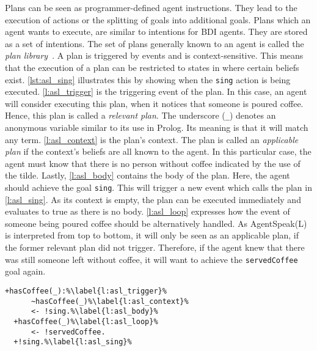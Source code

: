 Plans can be seen as programmer-defined agent instructions.
They lead to the execution of actions or the splitting of goals into additional goals.
Plans which an agent wants to execute, are similar to intentions for BDI agents.
They are stored as a set of intentions.
The set of plans generally known to an agent is called the \emph{plan library}~\cite{bordini_jason_2005}.
A plan is triggered by events and is context-sensitive.
This means that the execution of a plan can be restricted to states in where certain beliefs exist.
\autoref{lst:asl_sing} illustrates this by showing when the \texttt{sing} action is being executed.
\autoref{l:asl_trigger} is the triggering event of the plan.
In this case, an agent will consider executing this plan, when it notices that someone is poured coffee.
Hence, this plan is called a \emph{relevant plan}.
The underscore (\texttt{\_}) denotes an anonymous variable similar to its use in Prolog.
Its meaning is that it will match any term.
\autoref{l:asl_context} is the plan's context.
The plan is called an \emph{applicable plan} if the context's beliefs are all known to the agent.
In this particular case, the agent must know that there is no person without coffee indicated by the use of the tilde.
Lastly, \autoref{l:asl_body} contains the body of the plan.
Here, the agent should achieve the goal \texttt{sing}.
This will trigger a new event which calls the plan in \autoref{l:asl_sing}.
As its context is empty, the plan can be executed immediately and evaluates to true as there is no body.
\autoref{l:asl_loop} expresses how the event of someone being poured coffee should be alternatively handled.
As AgentSpeak(L) is interpreted from top to bottom, it will only be seen as an applicable plan, if the former relevant plan did not trigger.
Therefore, if the agent knew that there was still someone left without coffee, it will want to achieve the \texttt{servedCoffee} goal again.
\begin{lstlisting}[firstnumber=4, caption={Events for handling someone being poured a coffee as well as the \texttt{sing} plan.}, label=lst:asl_sing]
  +hasCoffee(_):%\label{l:asl_trigger}%
      ~hasCoffee(_)%\label{l:asl_context}%
      <- !sing.%\label{l:asl_body}%
  +hasCoffee(_)%\label{l:asl_loop}%
      <- !servedCoffee.
  +!sing.%\label{l:asl_sing}%
\end{lstlisting}
